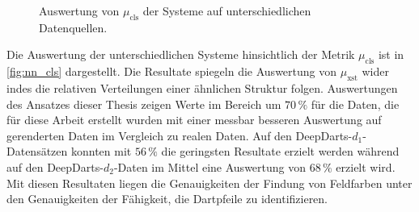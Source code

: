 \begin{figure}
    \centering
    \caption{Auswertung von $\mu_\text{cls}$ der Systeme auf unterschiedlichen Datenquellen.}
    \label{fig:nn_cls}
\end{figure}

Die Auswertung der unterschiedlichen Systeme hinsichtlich der Metrik $\mu_\text{cls}$ ist in \autoref{fig:nn_cls} dargestellt. Die Resultate spiegeln die Auswertung von $\mu_\text{xst}$ wider indes die relativen Verteilungen einer ähnlichen Struktur folgen. Auswertungen des Ansatzes dieser Thesis zeigen Werte im Bereich um $70\,\%$ für die Daten, die für diese Arbeit erstellt wurden mit einer messbar besseren Auswertung auf gerenderten Daten im Vergleich zu realen Daten. Auf den DeepDarts-$d_1$-Datensätzen konnten mit $56\,\%$ die geringsten Resultate erzielt werden während auf den DeepDarts-$d_2$-Daten im Mittel eine Auswertung von $68\,\%$ erzielt wird. Mit diesen Resultaten liegen die Genauigkeiten der Findung von Feldfarben unter den Genauigkeiten der Fähigkeit, die Dartpfeile zu identifizieren.


